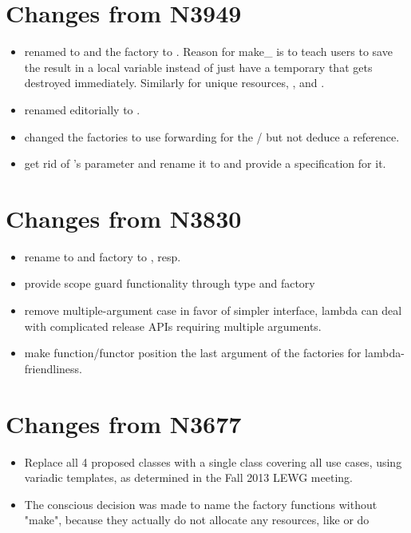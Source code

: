 \documentclass[ebook,11pt,article]{memoir}
\begin{document}
\section{Changes from N3949}
\begin{itemize}
\item renamed  to  and the factory to . Reason for make_ is to teach users to save the result in a local variable instead of just have a temporary that gets destroyed immediately. Similarly for unique resources, ,  and .
\item renamed editorially  to .
\item changed the factories to use forwarding for the / but not deduce a reference.
\item get rid of 's parameter and rename it to  and provide a  specification for it.
\end{itemize}


\section{Changes from N3830}
\begin{itemize}
\item rename to  and factory to , resp. 
\item provide scope guard functionality through type  and  factory
\item remove multiple-argument case in favor of simpler interface, lambda can deal with complicated release APIs requiring multiple arguments.
\item make function/functor position the last argument of the factories for lambda-friendliness.

\end{itemize}

\section{Changes from N3677}
\begin{itemize}
\item Replace all 4 proposed classes with a single class covering all use cases, using variadic templates, as determined in the Fall 2013 LEWG meeting.
\item The conscious decision was made to name the factory functions without "make", because they actually do not allocate any resources, like  or  do
\end{itemize}
\end{document}
